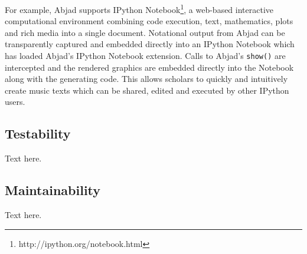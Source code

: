 For example, Abjad supports IPython
Notebook\footnote{http://ipython.org/notebook.html}, a web-based interactive
computational environment combining code execution, text, mathematics, plots
and rich media into a single document. Notational output from Abjad can be
transparently captured and embedded directly into an IPython Notebook which has
loaded Abjad's IPython Notebook extension. Calls to Abjad's \texttt{show()} are
intercepted and the rendered graphics are embedded directly into the Notebook
along with the generating code. This allows scholars to quickly and intuitively
create music texts which can be shared, edited and executed by other IPython
users.

\subsection{Testability}

Text here.

\subsection{Maintainability}

Text here.